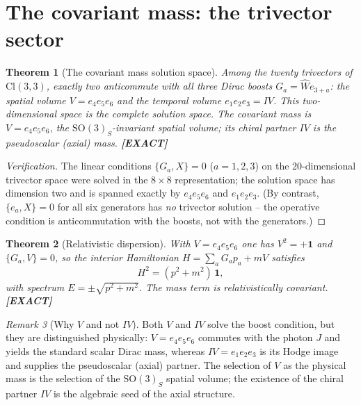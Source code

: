 \documentclass[11pt,oneside]{book}
\newcommand{\Wh}{\hat{W}}                         %
\newcommand{\Cl}{\mathrm{Cl}}                     %
\newcommand{\status}[1]{{\sffamily\bfseries\color{statuscol}[#1]}}
\theoremstyle{plain}
\newtheorem{theorem}{Theorem}[chapter]
\theoremstyle{definition}
\theoremstyle{remark}
\newtheorem{remark}[theorem]{Remark}
\begin{document}
\section{The covariant mass: the trivector sector}
\label{sec:covariant-mass}

\begin{theorem}[The covariant mass solution space]
\label{thm:mass-space}
Among the twenty trivectors of $\Cl(3,3)$, exactly two anticommute with all three
Dirac boosts $G_a=\Wh e_{3+a}$: the spatial volume $V=e_4e_5e_6$ and the temporal
volume $e_1e_2e_3=IV$. This two-dimensional space is the complete solution space.
The covariant mass is $V=e_4e_5e_6$, the $\mathrm{SO}(3)_S$-invariant spatial
volume; its chiral partner $IV$ is the pseudoscalar (axial) mass. \status{EXACT}
\end{theorem}

\begin{proof}[Verification]
The linear conditions $\{G_a,X\}=0$ ($a=1,2,3$) on the 20-dimensional trivector
space were solved in the $8\times8$ representation; the solution space has
dimension two and is spanned exactly by $e_4e_5e_6$ and $e_1e_2e_3$. (By contrast,
$\{e_a,X\}=0$ for all six generators has \emph{no} trivector solution -- the
operative condition is anticommutation with the boosts, not with the generators.)
\end{proof}

\begin{theorem}[Relativistic dispersion]
\label{thm:dispersion}
With $V=e_4e_5e_6$ one has $V^2=+\mathbf 1$ and $\{G_a,V\}=0$, so the interior
Hamiltonian $H=\sum_a G_a p_a+mV$ satisfies
\[
  H^2=(p^2+m^2)\,\mathbf 1,
\]
with spectrum $E=\pm\sqrt{p^2+m^2}$. The mass term is relativistically covariant.
\status{EXACT}
\end{theorem}

\begin{remark}[Why $V$ and not $IV$]
Both $V$ and $IV$ solve the boost condition, but they are distinguished physically:
$V=e_4e_5e_6$ commutes with the photon $J$ and yields the standard scalar Dirac
mass, whereas $IV=e_1e_2e_3$ is its Hodge image and supplies the pseudoscalar
(axial) partner. The selection of $V$ as the physical mass is the selection of the
$\mathrm{SO}(3)_S$ spatial volume; the existence of the chiral partner $IV$ is the
algebraic seed of the axial structure.
\end{remark}
\end{document}

